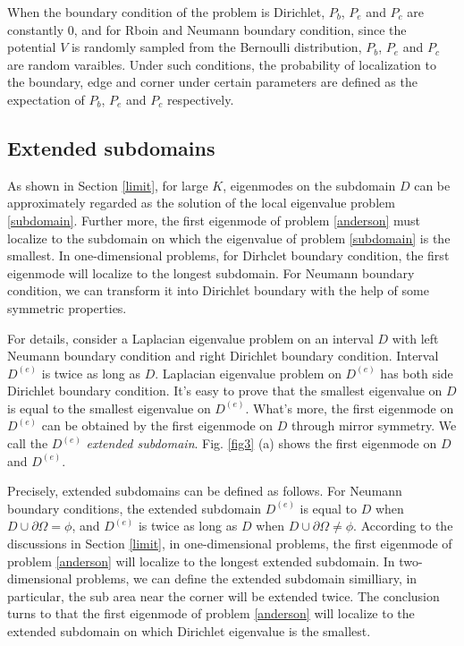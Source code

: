\documentclass[a4paper,11pt]{article}
\begin{document}
When the boundary condition of the problem is Dirichlet, $P_b$, $P_e$ and $P_c$ are constantly $0$, and for Rboin and Neumann boundary condition, since the potential $V$ is randomly sampled from the Bernoulli distribution, $P_b$, $P_e$ and $P_c$ are random varaibles. Under such conditions, the probability of localization to the boundary, edge and corner under certain parameters are defined as the expectation of $P_b$, $P_e$ and $P_c$ respectively.

\subsection{Extended subdomains}

As shown in Section \ref{limit}, for large $K$, eigenmodes on the subdomain $D$ can be approximately regarded as the solution of the local eigenvalue problem \eqref{subdomain}. Further more, the first eigenmode of problem \eqref{anderson} must localize to the subdomain on which the eigenvalue of problem \eqref{subdomain} is the smallest. In one-dimensional problems, for Dirhclet boundary condition, the first eigenmode will localize to the longest subdomain. For Neumann boundary condition, we can transform it into Dirichlet boundary with the help of some symmetric properties.

For details, consider a Laplacian eigenvalue problem on an interval $D$ with left Neumann boundary condition and right Dirichlet boundary condition. Interval $D^{(e)}$ is twice as long as $D$. Laplacian eigenvalue problem on $D^{(e)}$ has both side Dirichlet boundary condition. It's easy to prove that the smallest eigenvalue on $D$ is equal to the smallest eigenvalue on $D^{(e)}$. What's more, the first eigenmode on $D^{(e)}$ can be obtained by the first eigenmode on $D$ through mirror symmetry. We call the $D^{(e)}$ \emph{extended subdomain}. Fig. \ref{fig3} (a) shows the first eigenmode on $D$ and $D^{(e)}$.

Precisely, extended subdomains can be defined as follows. For Neumann boundary conditions, the extended subdomain $D^{(e)}$ is equal to $D$ when $D \cup \partial \Omega = \phi$, and $D^{(e)}$ is twice as long as $D$ when $D \cup \partial \Omega \neq \phi$. According to the discussions in Section \ref{limit}, in one-dimensional problems, the first eigenmode of problem \eqref{anderson} will localize to the longest extended subdomain. In two-dimensional problems, we can define the extended subdomain similliary, in particular, the sub area near the corner will be extended twice. The conclusion turns to that the first eigenmode of problem \eqref{anderson} will localize to the extended subdomain on which Dirichlet eigenvalue is the smallest.
\end{document}
